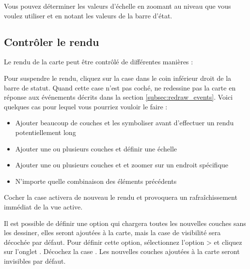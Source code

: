 Vous pouvez déterminer les valeurs d'échelle en zoomant au niveau que vous voulez utiliser et en notant les valeurs de la barre d'état.

\subsection{Contrôler le rendu}\label{label_controlmap}

Le rendu de la carte peut être contrôlé de différentes manières :

\label{label_suspendrender}

Pour suspendre le rendu, cliquez sur la case dans le coin inférieur droit de la barre de statut. Quand cette case n'est pas coché, \qg ne redessine pas la carte en réponse aux événements décrits dans la section \ref{subsec:redraw_events}. Voici quelques cas pour lequel vous pourriez vouloir le faire :

\begin{itemize}[label=--]
\item Ajouter beaucoup de couches et les symboliser avant d'effectuer un rendu potentiellement long
\item Ajouter une ou plusieurs couches et définir une échelle
\item Ajouter une ou plusieurs couches et et zoomer sur un endroit spécifique
\item N'importe quelle combinaison des éléments précédents
\end{itemize}

Cocher la case  activera de nouveau le rendu et provoquera un rafraîchissement immédiat de la vue active.

\label{label_settinglayer}

Il est possible de définir une option qui chargera toutes les nouvelles couches sans les dessiner, elles seront ajoutées à la carte, mais la case de visibilité sera décochée par défaut. Pour définir cette option, sélectionnez l'option  >  et cliquez sur l'onglet . Décochez la case . Les nouvelles couches ajoutées à la carte seront invisibles par défaut.

\label{label_stoprender}

